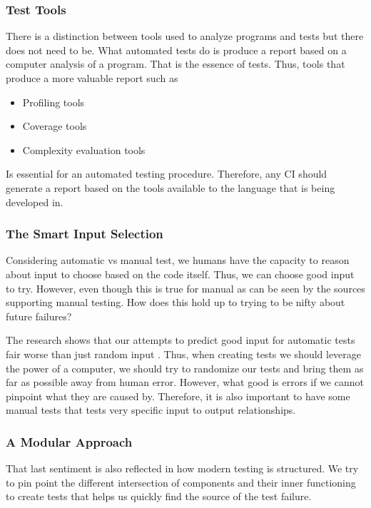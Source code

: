\documentclass{article}
\begin{document}
\subsubsection{Test Tools}
There is a distinction between tools used to analyze programs and tests but there does not need to be. What automated tests do is
produce a report based on a computer analysis of a program. That is the essence of tests. Thus, tools that produce a more valuable report such as
\begin{itemize}
    \item Profiling tools
    \item Coverage tools
    \item Complexity evaluation tools
\end{itemize}
Is essential for an automated testing procedure. Therefore, any CI should generate a report based on the tools available to the language that
is being developed in.


\subsubsection{The Smart Input Selection}
Considering automatic vs manual test, we humans have the capacity to reason about input to choose based on the code itself.
Thus, we can choose good input to try. However, even though this is true for manual as can be seen by the sources supporting manual
testing. How does this hold up to trying to be nifty about future failures?

The research shows that our attempts to predict good input for automatic tests fair worse than just random input \cite{meyer_seven_2008}. Thus, when 
creating tests we should leverage the power of a computer, we should try to randomize our tests and bring them as far as possible away from human error.
However, what good is errors if we cannot pinpoint what they are caused by. Therefore, it is also important to have some manual tests that tests very specific
input to output relationships.

\subsubsection{A Modular Approach}

That last sentiment is also reflected in how modern testing is structured. We try to pin point
the different intersection of components and their inner functioning to create tests that helps us quickly
find the source of the test failure.
\end{document}
